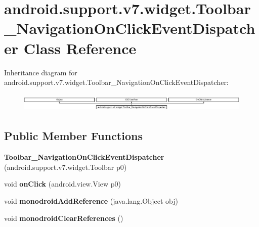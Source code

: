 \hypertarget{classandroid_1_1support_1_1v7_1_1widget_1_1_toolbar___navigation_on_click_event_dispatcher}{}\section{android.\+support.\+v7.\+widget.\+Toolbar\+\_\+\+Navigation\+On\+Click\+Event\+Dispatcher Class Reference}
\label{classandroid_1_1support_1_1v7_1_1widget_1_1_toolbar___navigation_on_click_event_dispatcher}
Inheritance diagram for android.\+support.\+v7.\+widget.\+Toolbar\+\_\+\+Navigation\+On\+Click\+Event\+Dispatcher\+:\begin{figure}[H]
\begin{center}
\leavevmode
\includegraphics[height=0.891010cm]{classandroid_1_1support_1_1v7_1_1widget_1_1_toolbar___navigation_on_click_event_dispatcher}
\end{center}
\end{figure}
\subsection*{Public Member Functions}
\begin{DoxyCompactItemize}
\item 
\mbox{\label{classandroid_1_1support_1_1v7_1_1widget_1_1_toolbar___navigation_on_click_event_dispatcher_a0c1d66856f34b4dcbc6387abdebd3c72}} 
{\bfseries Toolbar\+\_\+\+Navigation\+On\+Click\+Event\+Dispatcher} (android.\+support.\+v7.\+widget.\+Toolbar p0)
\item 
\mbox{\label{classandroid_1_1support_1_1v7_1_1widget_1_1_toolbar___navigation_on_click_event_dispatcher_a59518f53b2c1df0102f4833a6260d5dc}} 
void {\bfseries on\+Click} (android.\+view.\+View p0)
\item 
\mbox{\label{classandroid_1_1support_1_1v7_1_1widget_1_1_toolbar___navigation_on_click_event_dispatcher_af7f274e66fb83d380643feda03368bbb}} 
void {\bfseries monodroid\+Add\+Reference} (java.\+lang.\+Object obj)
\item 
\mbox{\label{classandroid_1_1support_1_1v7_1_1widget_1_1_toolbar___navigation_on_click_event_dispatcher_ae35f48770412dbae3caf5ebef20a26f9}} 
void {\bfseries monodroid\+Clear\+References} ()
\end{DoxyCompactItemize}
